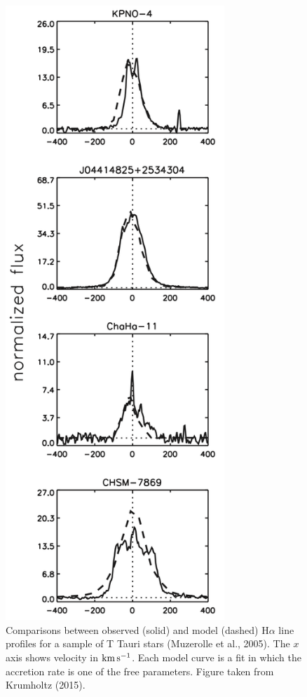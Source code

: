\documentclass[a4paper,10pt]{article}
\begin{document}
\begin{figure}[t!]
    \centering
    \includegraphics[width=8.25cm]{figures/TTinfall.png}
    \caption{\footnotesize{Comparisons between observed (solid) and model (dashed) H$\alpha$ line profiles for a sample of T Tauri stars (Muzerolle et al., 2005). The $x$ axis shows velocity in ${\rm km\,s^{-1}}$. Each model curve is a fit in which the accretion rate is one of the free parameters. Figure taken from Krumholtz (2015).}}
    \label{fig:ttinfall}
\end{figure}
\end{document}
